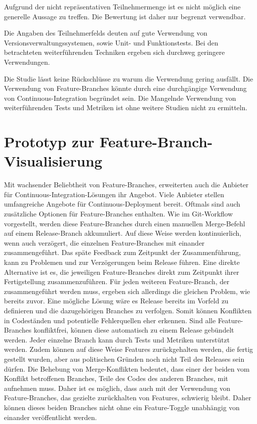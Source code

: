 Aufgrund der nicht repräsentativen Teilnehmermenge ist es nicht möglich eine generelle Aussage zu treffen. Die Bewertung ist daher nur begrenzt verwendbar.

Die Angaben des Teilnehmerfelds deuten auf gute Verwendung von Versionsverwaltungssystemen, sowie Unit- und Funktionstests. Bei den betrachteten weiterführenden Techniken ergeben sich durchweg geringere Verwendungen.

Die Studie lässt keine Rückschlüsse zu warum die Verwendung gering ausfällt. Die Verwendung von Feature-Branches könnte durch eine durchgängige Verwendung von Continuous-Integration begründet sein. Die Mangelnde Verwendung von weiterführenden Tests und Metriken ist ohne weitere Studien nicht zu ermitteln.

\section{Prototyp zur Feature-Branch-Visualisierung}

Mit wachsender Beliebtheit von Feature-Branches, erweiterten auch die Anbieter für Continuous-Integration-Lösungen ihr Angebot. Viele Anbieter stellen umfangreiche Angebote für Continuous-Deployment bereit. Oftmals sind auch zusätzliche Optionen für Feature-Branches enthalten. Wie im Git-Workflow vorgestellt, werden diese Feature-Branches durch einen manuellen Merge-Befehl auf einem Release-Branch akkumuliert. Auf diese Weise werden kontinuierlich, wenn auch verzögert, die einzelnen Feature-Branches mit einander zusammengeführt. Das späte Feedback zum Zeitpunkt der Zusammenführung, kann zu Problemen und zur Verzögerungen beim Release führen. Eine direkte Alternative ist es, die jeweiligen Feature-Branches direkt zum Zeitpunkt ihrer Fertigstellung zusammenzuführen. Für jeden weiteren Feature-Branch, der zusammengeführt werden muss, ergeben sich allerdings die gleichen Problem, wie bereits zuvor.
Eine mögliche Lösung wäre es Release bereits im Vorfeld zu definieren und die dazugehörigen Branches zu verfolgen. Somit können Konflikten in Codeständen und potentielle Fehlerquellen eher erkennen. Sind alle Feature-Branches konfliktfrei, können diese automatisch zu einem Release gebündelt werden. Jeder einzelne Branch kann durch Tests und Metriken unterstützt werden. Zudem können auf diese Weise Features zurückgehalten werden, die fertig gestellt wurden, aber aus politischen Gründen noch nicht Teil des Releases sein dürfen. 
Die Behebung von Merge-Konflikten bedeutet, dass einer der beiden vom Konflikt betroffenen Branches, Teile des Codes des anderen Branches, mit aufnehmen muss. Daher ist es möglich, dass auch mit der Verwendung von Feature-Branches, das gezielte zurückhalten von Features, schwierig bleibt. Daher können dieses beiden Branches nicht ohne ein Feature-Toggle unabhängig von einander veröffentlicht werden.

